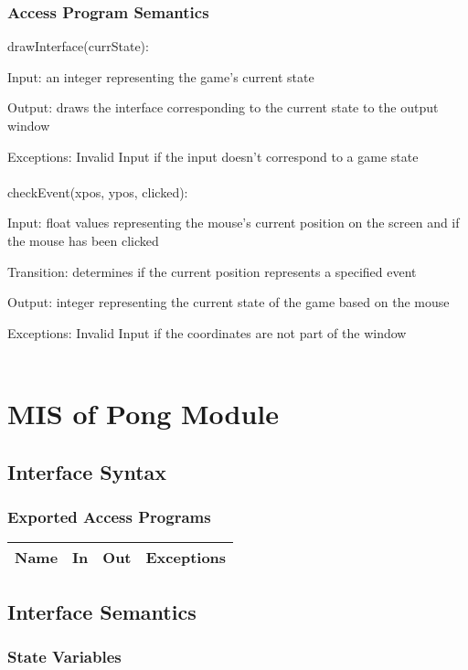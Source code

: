 \documentclass[12pt, titlepage]{article}
\begin{document}
		\subsubsection{Access Program Semantics}
		drawInterface(currState):
		
		Input: an integer representing the game's current state
		
		Output: draws the interface corresponding to the current state to the output window
		
		Exceptions: Invalid Input if the input doesn't correspond to a game state\\
		\\
		checkEvent(xpos, ypos, clicked):
		
		Input: float values representing the mouse's current position on the screen and if the mouse has been clicked
		
		Transition: determines if the current position represents a specified event
		
		Output: integer representing the current state of the game based on the mouse
		
		Exceptions: Invalid Input if the coordinates are not part of the window\\
		\\
		
	
\section{MIS of Pong Module}
	\subsection{Interface Syntax}
		\subsubsection{Exported Access Programs}
		\begin{table}[!htbp]
		\begin{tabular}{|c|c|c|c|}
			\hline
			Name & In & Out & Exceptions \\ \hline

		\end{tabular}
	\end{table}
		
	\subsection{Interface Semantics}
		\subsubsection{State Variables}
\end{document}
